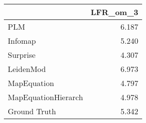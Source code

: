 \begin{tabular}{lr}
\toprule
{} & LFR_om_3 \\
\midrule
PLM                 &    6.187 \\
Infomap             &    5.240 \\
Surprise            &    4.307 \\
LeidenMod           &    6.973 \\
MapEquation         &    4.797 \\
MapEquationHierarch &    4.978 \\
Ground Truth        &    5.342 \\
\bottomrule
\end{tabular}
